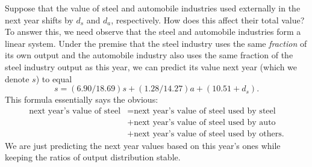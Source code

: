 Suppose that the value of steel and automobile industries used externally in the
next year shifts by $d_s$ and $d_a$, respectively. How does this affect their
total value? To answer this, we need observe that the steel and automobile
industries form a linear system. Under the premise that the steel industry uses
the same \emph{fraction} of its own output and the automobile industry also uses
the same fraction of the steel industry output as this year, we can predict its
value next year (which we denote $s$) to equal
\[
 s = (6.90 / 18.69)s + (1.28 / 14.27)a + (10.51 + d_s).
\]
This formula essentially says the obvious:
\begin{align*}
 \text{next year's value of steel} &= \text{next year's value of steel used by
 steel}\\
                                   &+ \text{next year's value of steel used by
                                   auto}\\
                                   &+ \text{next year's value of steel used by
                                   others}.
\end{align*}
We are just predicting the next year values based on this year's ones while
keeping the ratios of output distribution stable.

